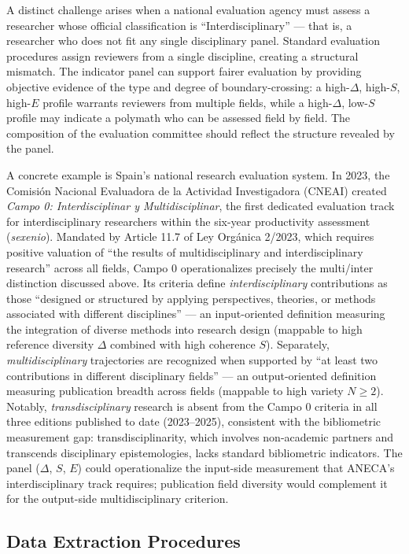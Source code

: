 \documentclass[
]{article}
\begin{document}
A distinct challenge arises when a national evaluation agency must
assess a researcher whose official classification is
``Interdisciplinary'' --- that is, a researcher who does not fit any
single disciplinary panel. Standard evaluation procedures assign
reviewers from a single discipline, creating a structural mismatch. The
indicator panel can support fairer evaluation by providing objective
evidence of the type and degree of boundary-crossing: a high-\(\Delta\),
high-\(S\), high-\(E\) profile warrants reviewers from multiple fields,
while a high-\(\Delta\), low-\(S\) profile may indicate a polymath who
can be assessed field by field. The composition of the evaluation
committee should reflect the structure revealed by the panel.

A concrete example is Spain's national research evaluation system. In
2023, the Comisión Nacional Evaluadora de la Actividad Investigadora
(CNEAI) created \emph{Campo 0: Interdisciplinar y Multidisciplinar}, the
first dedicated evaluation track for interdisciplinary researchers
within the six-year productivity assessment (\emph{sexenio}). Mandated
by Article 11.7 of Ley Orgánica 2/2023, which requires positive
valuation of ``the results of multidisciplinary and interdisciplinary
research'' across all fields, Campo 0 operationalizes precisely the
multi/inter distinction discussed above. Its criteria define
\emph{interdisciplinary} contributions as those ``designed or structured
by applying perspectives, theories, or methods associated with different
disciplines'' --- an input-oriented definition measuring the integration
of diverse methods into research design (mappable to high reference
diversity \(\Delta\) combined with high coherence \(S\)). Separately,
\emph{multidisciplinary} trajectories are recognized when supported by
``at least two contributions in different disciplinary fields'' --- an
output-oriented definition measuring publication breadth across fields
(mappable to high variety \(N \geq 2\)). Notably,
\emph{transdisciplinary} research is absent from the Campo 0 criteria in
all three editions published to date (2023--2025), consistent with the
bibliometric measurement gap: transdisciplinarity, which involves
non-academic partners and transcends disciplinary epistemologies, lacks
standard bibliometric indicators. The panel (\(\Delta\), \(S\), \(E\))
could operationalize the input-side measurement that ANECA's
interdisciplinary track requires; publication field diversity would
complement it for the output-side multidisciplinary criterion.

\hypertarget{data-extraction-procedures}{%
\subsection{Data Extraction
Procedures}\label{data-extraction-procedures}}
\end{document}

